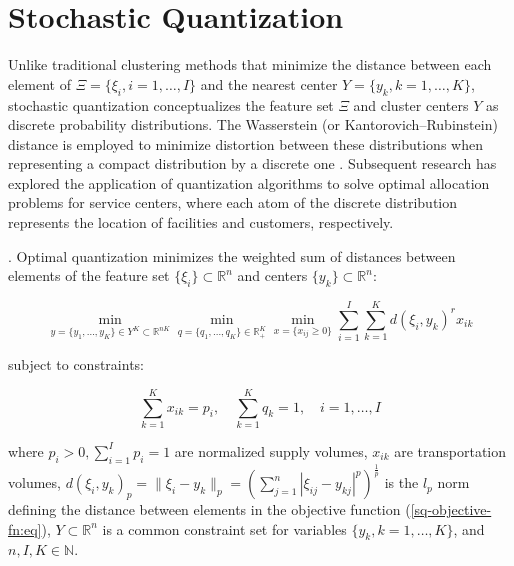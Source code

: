 \section{Stochastic Quantization}

Unlike traditional clustering methods that minimize the distance between each element of $\Xi = \{\xi_i, i = 1, \ldots, I\}$ and the nearest center $Y = \{y_k, k = 1, \ldots, K\}$, stochastic quantization conceptualizes the feature set $\Xi$ and cluster centers $Y$ as discrete probability distributions. The Wasserstein (or Kantorovich–Rubinstein) distance is employed to minimize distortion between these distributions when representing a compact distribution by a discrete one \cite{Kuzmenko_Uryasev_2019,Lakshmanan_Pichler_2023}. Subsequent research \cite{Kuzmenko_Uryasev_2019,Norkin_Onishchenko_2005} has explored the application of quantization algorithms to solve optimal allocation problems for service centers, where each atom of the discrete distribution represents the location of facilities and customers, respectively.

\begin{definition}
    \label{Stochastic Quantization} \cite{Kuzmenko_Uryasev_2019}. Optimal quantization minimizes the weighted sum of distances between elements of the feature set $\{\xi_i\} \subset \mathbb{R}^{n}$ and centers $\{y_k\} \subset \mathbb{R}^{n}$:

    \begin{equation}
        \label{sq-objective-fn:eq}
            \min_{y = \{ y_1, \ldots, y_K \} \in Y^K \subset \mathbb{R}^{nK}} \min_{q = \{ q_1, \ldots, q_K \} \in \mathbb{R}^K_{+}} \min_{x = \{ x_{ij} \geq 0 \}} \sum_{i=1}^I \sum_{k=1}^K d(\xi_i, y_k)^r x_{ik}
    \end{equation}

    subject to constraints:

    \begin{equation}
        \label{sq-objective-constraints:eq}
            \sum_{k=1}^K x_{ik} = p_i, \quad \sum_{k=1}^K q_k = 1, \quad i = 1, \ldots, I
    \end{equation}

    \noindent where $p_i > 0, \sum_{i=1}^I p_i = 1$ are normalized supply volumes, $x_{ik}$ are transportation volumes, $ d(\xi_i, y_k)_p = \| \xi_i - y_k \|_p = (\sum_{j=1}^n | \xi_{ij} - y_{kj} |^p)^{\frac{1}{p}} $ is the $l_p$ norm defining the distance between elements in the objective function (\ref{sq-objective-fn:eq}), $Y \subset \mathbb{R}^{n}$ is a common constraint set for variables $\{y_k, k = 1, \ldots, K\}$, and $n, I, K \in \mathbb{N}$.
\end{definition}

